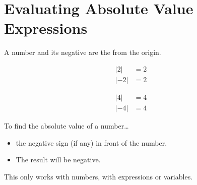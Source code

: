 \section{Evaluating Absolute Value Expressions}

A number and its negative are the   from the origin.
\begin{tcbraster}[
    raster columns=2,
    raster before skip = 1em, raster after skip = 1em,
    ]
    \begin{tcolorbox}[colback=white,]
        \vspace{2\baselineskip}
        \begin{align*}
            |2| &= 2\\
            |-2| &= 2
        \end{align*}
    \end{tcolorbox}
    \begin{tcolorbox}[colback=white,]
        \vspace{2\baselineskip}
        \begin{align*}
            |4| &= 4\\
            |-4| &= 4
        \end{align*}
    \end{tcolorbox}
\end{tcbraster}

\begin{myConcept}{To find the absolute value of a number\dots}
    \begin{itemize}
        \item {} the negative sign (if any) in front of the number.
        \item The result will  be negative.
    \end{itemize}
    \begin{tcolorbox}[center,width=5.5in,colback=white,]
        \centering
        This only works with numbers,  with expressions or variables.
    \end{tcolorbox}
\end{myConcept}

